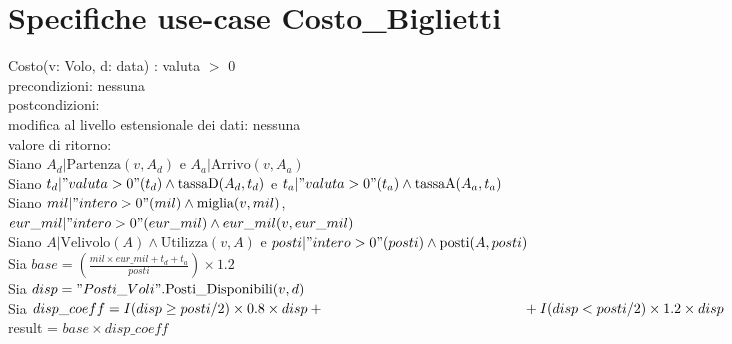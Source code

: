 \documentclass[a4paper,12pt]{report}
\begin{document}
      \section{Specifiche use-case Costo\_Biglietti}
        \hspace*{1cm}Costo(v: Volo, d: data) : valuta $>$ 0 \\
        \hspace*{2cm}precondizioni: nessuna \\
        \hspace*{2cm}postcondizioni: \\
        \hspace*{3cm}modifica al livello estensionale dei dati: nessuna \\
        \hspace*{3cm}valore di ritorno: \\
        \hspace*{4cm}Siano $A_d | \text{Partenza}(v, A_d)$ e $A_a | \text{Arrivo}(v, A_a)$ \\
        \hspace*{4cm}Siano $t_d | "valuta > 0"(t_d) \wedge \text{tassaD}(A_d, t_d)$ e $t_a | "valuta > 0"(t_a) \wedge \text{tassaA}(A_a, t_a)$ \\
        \hspace*{4cm}Siano $mil | "intero > 0"(mil) \wedge \text{miglia}(v, mil)$, \\
        \hspace*{5cm}$eur\_mil | "intero > 0"(eur\_mil) \wedge eur\_mil(v, eur\_mil)$ \\
        \hspace*{4cm}Siano $A | \text{Velivolo}(A) \wedge \text{Utilizza}(v, A)$ e $posti | "intero > 0"(posti) \wedge \text{posti}(A, posti)$ \\
        \hspace*{4cm}Sia $base = \left(\frac{mil \times eur\_mil + t_d + t_a}{posti}\right) \times 1.2$ \\
        \hspace*{4cm}Sia $disp = "Posti\_Voli".\text{Posti\_Disponibili}(v, d)$ \\
        \hspace*{4cm}Sia $disp\_coeff = I(disp \geq posti/2) \times 0.8 \times disp + \\
        \hspace*{5cm}+ I(disp < posti/2) \times 1.2 \times disp$ \\
        \hspace*{4cm}result = $base \times disp\_coeff$ \\ \\
\end{document}
